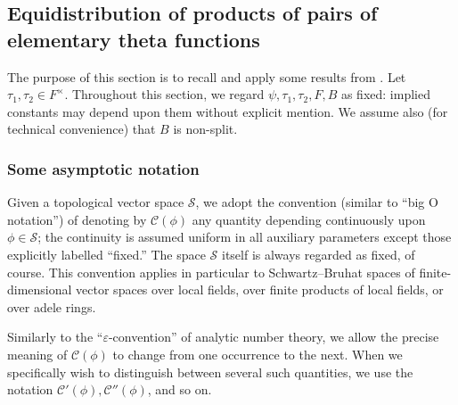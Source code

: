 \documentclass[reqno,10pt]{amsart}
\theoremstyle{plain} %
\theoremstyle{definition}
\theoremstyle{plain} %
\theoremstyle{remark}
\theoremstyle{itplain} %
\theoremstyle{remark} %
\numberwithin{equation}{section}
\def\eps{\varepsilon}
\begin{document}
\subsection{Equidistribution of products of pairs of elementary theta functions\label{sec:equid-prod-pairs-theta}}
\label{sec-3-5}
The purpose of this section is to recall and apply some results from \cite{nelson-theta-squared}.  Let $\tau_1,\tau_2 \in F^\times$.  Throughout this section, we regard $\psi,\tau_1,\tau_2,F,B$ as fixed: implied constants may depend upon them without explicit mention.  We assume also (for technical convenience) that $B$ is non-split.


\subsubsection{Some asymptotic notation}\label{sec:some-asympt-notat}
Given a topological vector space $\mathcal{S}$, we adopt the convention (similar to ``big O notation'') of denoting by $\mathcal{C}(\phi)$ any quantity depending continuously upon $\phi \in \mathcal{S}$; the continuity is assumed uniform in all auxiliary parameters except those explicitly labelled ``fixed.''  The space $\mathcal{S}$ itself is always regarded as fixed, of course.  This convention applies in particular to Schwartz--Bruhat spaces of finite-dimensional vector spaces over local fields, over finite products of local fields, or over adele rings.

Similarly to the ``$\eps$-convention'' of analytic number theory, we allow the precise meaning of $\mathcal{C}(\phi)$ to change from one occurrence to the next.  When we specifically wish to distinguish between several such quantities, we use the notation $\mathcal{C} '(\phi), \mathcal{C} ''(\phi)$, and so on.
\end{document}

